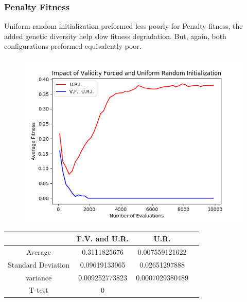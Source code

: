 \documentclass{article}
\begin{document}
		\subsubsection{Penalty Fitness}
			Uniform random initialization preformed less poorly for Penalty fitness, the added
			genetic diversity help slow fitness degradation. But, again, both configurations
			preformed equivalently poor.

			\begin{figure}[!htb]
			\centering
			\includegraphics[scale=0.4]{q2_assigned_board_penalty_ur_vs_vfur.png}
			\end{figure}
			\begin{center}
			\begin{tabular}{ || c | c | c | c ||}
			\hline
			       & F.V. and U.R. & U.R.\\ 
			 \hline\hline
			 Average & 0.3111825676 &	0.007559121622 \\ 
			 \hline
			 Standard Deviation &	0.09619133965	& 0.02651297888\\
			 \hline
			 variance &	0.009252773823 &	0.0007029380489 \\
			 \hline
			 T-test &	0	& \\
			 \hline
			\end{tabular}
			\end{center}
	
\end{document}
